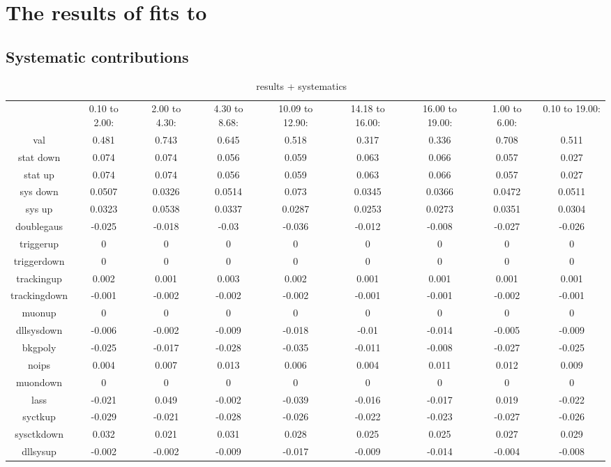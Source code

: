\chapter{The results of fits to \BdToKpill}
\label{all:swave:fits}


\section{Systematic contributions}



{\scriptsize
\begin{table}[tbp]
\caption{ \FL results + systematics ~\label{tbl:swave:meas:fl:results} }
\begin{tabular}{|c|c|c|c|c|c|c|c|c|}
\hline
 & 0.10 to  2.00: & 2.00 to  4.30: & 4.30 to  8.68: & 10.09 to  12.90: & 14.18 to  16.00: & 16.00 to  19.00: & 1.00 to  6.00: & 0.10 to  19.00:\\ 
val & 0.481 & 0.743 & 0.645 & 0.518 & 0.317 & 0.336 & 0.708 & 0.511\\ 
stat down & 0.074 & 0.074 & 0.056 & 0.059 & 0.063 & 0.066 & 0.057 & 0.027\\ 
stat up & 0.074 & 0.074 & 0.056 & 0.059 & 0.063 & 0.066 & 0.057 & 0.027\\ 
sys down & 0.0507 & 0.0326 & 0.0514 & 0.073 & 0.0345 & 0.0366 & 0.0472 & 0.0511\\ 
sys up & 0.0323 & 0.0538 & 0.0337 & 0.0287 & 0.0253 & 0.0273 & 0.0351 & 0.0304\\ 
doublegaus & -0.025 & -0.018 & -0.03 & -0.036 & -0.012 & -0.008 & -0.027 & -0.026\\ 
triggerup & 0 & 0 & 0 & 0 & 0 & 0 & 0 & 0\\ 
triggerdown & 0 & 0 & 0 & 0 & 0 & 0 & 0 & 0\\ 
trackingup & 0.002 & 0.001 & 0.003 & 0.002 & 0.001 & 0.001 & 0.001 & 0.001\\ 
trackingdown & -0.001 & -0.002 & -0.002 & -0.002 & -0.001 & -0.001 & -0.002 & -0.001\\ 
muonup & 0 & 0 & 0 & 0 & 0 & 0 & 0 & 0\\ 
dllsysdown & -0.006 & -0.002 & -0.009 & -0.018 & -0.01 & -0.014 & -0.005 & -0.009\\ 
bkgpoly & -0.025 & -0.017 & -0.028 & -0.035 & -0.011 & -0.008 & -0.027 & -0.025\\ 
noips & 0.004 & 0.007 & 0.013 & 0.006 & 0.004 & 0.011 & 0.012 & 0.009\\ 
muondown & 0 & 0 & 0 & 0 & 0 & 0 & 0 & 0\\ 
lass & -0.021 & 0.049 & -0.002 & -0.039 & -0.016 & -0.017 & 0.019 & -0.022\\ 
syctkup & -0.029 & -0.021 & -0.028 & -0.026 & -0.022 & -0.023 & -0.027 & -0.026\\ 
sysctkdown & 0.032 & 0.021 & 0.031 & 0.028 & 0.025 & 0.025 & 0.027 & 0.029\\ 
dllsysup & -0.002 & -0.002 & -0.009 & -0.017 & -0.009 & -0.014 & -0.004 & -0.008\\ 
\hline
\end{tabular}
\end{table}


}
